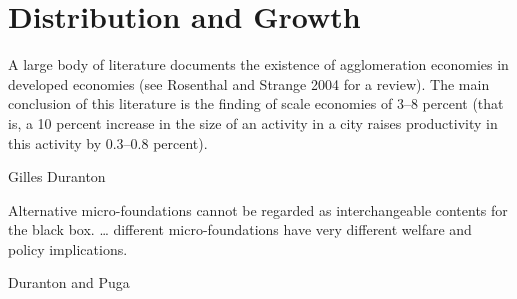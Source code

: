 \chapter{Distribution and Growth} \label{chapter-distribution}

\epigraph{A large body of literature documents the existence of agglomeration economies in developed economies (see Rosenthal and Strange 2004 for a review). The main conclusion of this literature is the finding of scale economies of 3--8 percent (that is, a 10 percent increase in the size of an activity in a city raises productivity in this activity by 0.3--0.8 percent).}{Gilles Duranton \cite{durantonAreCitiesEngines2009}} 

\epigraph{Alternative micro-foundations cannot be regarded as interchangeable contents for the black box. \dots%
different micro-foundations have very different welfare and policy implications. %
}{Duranton and Puga \cite{durantonMicroFoundationsUrbanAgglomeration2004}}




